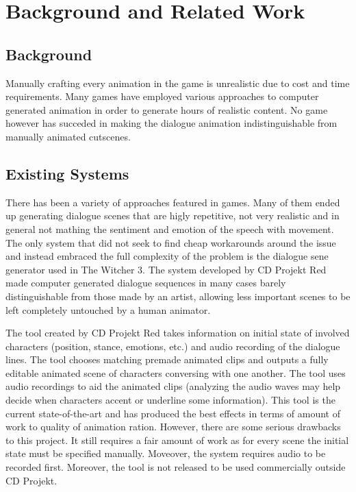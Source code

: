 \chapter{Background and Related Work \label{chap:background}}

\section{Background}
Manually crafting every animation in the game is unrealistic due to cost and time requirements. Many games have employed various approaches to computer generated animation in order to generate hours of realistic content. No game however has succeded in making the dialogue animation indistinguishable from manually animated cutscenes.

\section{Existing Systems}

There has been a variety of approaches featured in games. Many of them ended up generating dialogue scenes that are higly repetitive, not very realistic and in general not mathing the sentiment and emotion of the speech with movement. The only system that did not seek to find cheap workarounds around the issue and instead embraced the full complexity of the problem is the dialogue sene generator used in The Witcher 3. The system developed by CD Projekt Red made computer generated dialogue sequences in many cases barely distinguishable from those made by an artist, allowing less important scenes to be left completely untouched by a human animator. ~\cite{pcgamerwitcher}


The tool created by CD Projekt Red takes information on initial state of involved characters (position, stance, emotions, etc.) and audio recording of the dialogue lines. The tool chooses matching premade animated clips and outputs a fully editable animated scene of characters conversing with one another. The tool uses audio recordings to aid the animated clips (analyzing the audio waves may help decide when characters accent or underline some information). This tool is the current state-of-the-art and has produced the best effects in terms of amount of work to quality of animation ration. However, there are some serious drawbacks to this project. It still requires a fair amount of work as for every scene the initial state must be specified manually. Moveover, the system requires audio to be recorded first. Moreover, the tool is not released to be used commercially outside CD Projekt. ~\cite{gdcwitcher}


